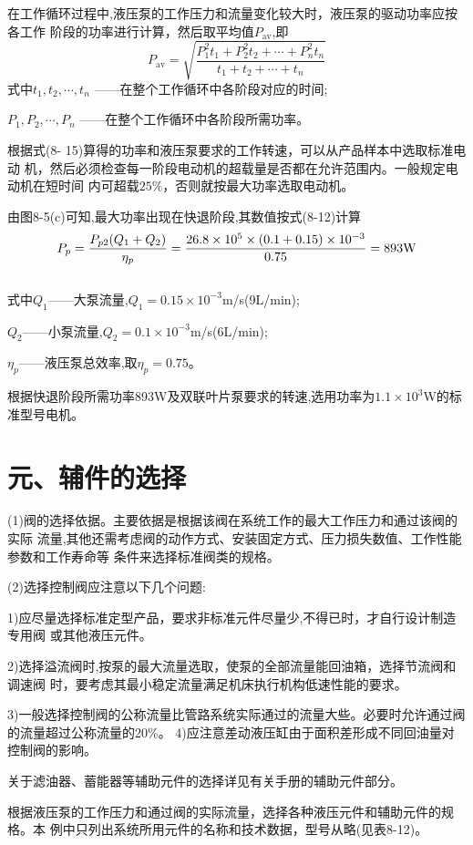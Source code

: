 
在工作循环过程中,液压泵的工作压力和流量变化较大时，液压泵的驱动功率应按各工作
阶段的功率进行计算，然后取平均值$P_{\text {av}}$,即
\begin{equation}
P_{\text{av}}=\sqrt{\frac{P^2_1t_1+P^2_2t_2+\cdots+P^2_n t_n}{t_1+t_2+\cdots+t_n}}
\end{equation}
式中\quad$t_1,t_2,\cdots,t_n$ ——在整个工作循环中各阶段对应的时间;

$P_1,P_2,\cdots ,P_n$ ——在整个工作循环中各阶段所需功率。

根据式(8- 15)算得的功率和液压泵要求的工作转速，可以从产品样本中选取标准电动
机，然后必须检查每一阶段电动机的超载量是否都在允许范围内。一般规定电动机在短时间
内可超载$25\%$，否则就按最大功率选取电动机。

由图8-5(c)可知,最大功率出现在快退阶段,其数值按式(8-12)计算\\
$$P_p=\frac{P_{p2}(Q_1+Q_2)}{\eta _p}=\frac{26.8\times 10^5\times(0.1+0.15)\times10^{-3} }{0.75}=893\text W$$\\
式中\quad$Q_1$——大泵流量,$Q_1=0.15\times 10^{-3}$m/s(9L/min);

$Q_2$——小泵流量,$Q_2=0.1\times 10^{-3}$m/s(6L/min);

$\eta_p$——液压泵总效率,取$\eta_p=0.75$。

根据快退阶段所需功率893W及双联叶片泵要求的转速,选用功率为$1.1\times10^3$W的标准型号电机。

\section {元、辅件的选择}
(1)阀的选择依据。主要依据是根据该阀在系统工作的最大工作压力和通过该阀的实际
流量,其他还需考虑阀的动作方式、安装固定方式、压力损失数值、工作性能参数和工作寿命等
条件来选择标准阀类的规格。

(2)选择控制阀应注意以下几个问题:

1)应尽量选择标准定型产品，要求非标准元件尽量少,不得已时，才自行设计制造专用阀
或其他液压元件。

2)选择溢流阀时,按泵的最大流量选取，使泵的全部流量能回油箱，选择节流阀和调速阀
时，要考虑其最小稳定流量满足机床执行机构低速性能的要求。

3)一般选择控制阀的公称流量比管路系统实际通过的流量大些。必要时允许通过阀
的流量超过公称流量的20\%。
4)应注意差动液压缸由于面积差形成不同回油量对控制阀的影响。

关于滤油器、蓄能器等辅助元件的选择详见有关手册的辅助元件部分。

根据液压泵的工作压力和通过阀的实际流量，选择各种液压元件和辅助元件的规格。本
例中只列出系统所用元件的名称和技术数据，型号从略(见表8-12)。

